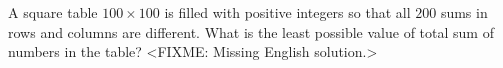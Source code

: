 \problem
A square table $100 \times 100$ is filled with positive integers so that all
$200$ sums in rows and columns are different.
What is the least possible value of total sum of numbers in the table?
\solution
<FIXME: Missing English solution.>
\endproblem
